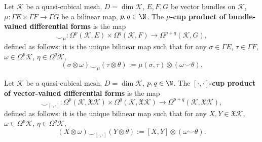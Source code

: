 \begin{definition}
  Let
    $\mathcal{K}$ be a quasi-cubical mesh,
    $D = \dim \mathcal{K}$,
    $E, F, G$ be vector bundles on $\mathcal{K}$,
    $\mu \colon \Gamma E \times \Gamma F \to \Gamma G$ be a bilinear map,
    $p, q \in \N$.
  The \textbf{$\mu$-cup product of bundle-valued differential forms} is the map
  \begin{equation}
    \smile_\mu
    \colon \Omega^p(\mathcal{K}, E) \times \Omega^q(\mathcal{K}, F)
    \to \Omega^{p + q}(\mathcal{K}, G),
  \end{equation}
  defined as follows: it is the unique bilinear map such that for any
  $\sigma \in \Gamma E$,
  $\tau \in \Gamma F$,
  $\omega \in \Omega^p \mathcal{K}$,
  $\eta \in \Omega^q \mathcal{K}$,
  \begin{equation}
    (\sigma \otimes \omega) \smile_\mu (\tau \otimes \theta) :=
    \mu(\sigma, \tau) \otimes (\omega \smile \theta).
  \end{equation}
\end{definition}
\begin{example}
  Let
    $\mathcal{K}$ be a quasi-cubical mesh,
    $D = \dim \mathcal{K}$,
    $p, q \in \N$.
  The \textbf{$[\cdot, \cdot]$-cup product of vector-valued differential forms}
  is the map
  \begin{equation}
    \smile_{[\cdot, \cdot]}
    \colon \Omega^p(\mathcal{K}, \mathfrak{X} \mathcal{K})
    \times \Omega^q(\mathcal{K}, \mathfrak{X} \mathcal{K})
    \to \Omega^{p + q}(\mathcal{K}, \mathfrak{X} \mathcal{K}),
  \end{equation}
  defined as follows: it is the unique bilinear map such that for any
  $X, Y \in \mathfrak{X} \mathcal{K}$,
  $\omega \in \Omega^p \mathcal{K}$,
  $\eta \in \Omega^q \mathcal{K}$,
  \begin{equation}
    (X \otimes \omega) \smile_{[\cdot, \cdot]} (Y \otimes \theta) :=
    [X, Y] \otimes (\omega \smile \theta).
  \end{equation}
\end{example}
